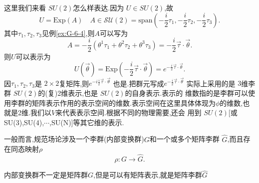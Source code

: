 \documentclass[../main.tex]{subfiles}
\begin{document}
 这里我们来看 $SU(2)$怎么样表达.因为 $U \in SU(2)$,故\[
 U = \text{Exp}(A) \quad A\in \mathscr{SU}(2) = \text{span}(-\frac{i}{2}\tau_1,-\frac{i}{2}\tau_2,-\frac{i}{2}\tau_3)
 .\] 
 其中$\tau_1,\tau_2,\tau_3$见例\ref{ex:G-6-4},则$A$可以写为 \[
 A = -\frac{i}{2}(\theta^1\tau_1 + \theta^2 \tau_2 +\theta^3 \tau_3) = -\frac{i}{2} \vec{\tau}\cdot \vec{\theta} 
 .\] 
 则$U$可以表示为 \[
 U(\vec{\theta}) = \text{Exp}(- \frac{i}{2} \vec{\tau}\cdot \vec{\theta}) = e^{- \frac{i}{2} \vec{\tau}\cdot \vec{\theta}}
 .\] 
 因$\tau_1,\tau_2,\tau_3$是 $2\times 2$复矩阵,则$e^{-i \frac{i}{2}\vec{\tau}\cdot \vec{\theta}}$ 也是.把群元写成$e^{-\frac{i}{2} \vec{\tau}\cdot \vec{\theta}}$ 实际上采用的是 $3$维李群 $SU(2)$的(复)2维表示,也是 $SU(2)$的自身表示.表示的
 维数指的是李群可以使用李群的矩阵表示作用的表示空间的维数.表示空间在这里具体体现为$\phi$的维数,也就是2维.我们以$V$来代表表示空间.根据不同的物理需要,还会
 用到 $SU(2)$[或SU(3),SU(4),$\cdots$,SU(N)]等其它维的表示.

 一般而言,规范场论涉及一个李群(内部变换群)$G$和一个或多个矩阵李群 $\hat{G}$,而且存在同态映射$\rho$\[
\rho : G \to \hat{G} 
 .\] 
 \begin{note}
   内部变换群不一定是矩阵群$G$,但是可以有矩阵表示,就是矩阵李群$\hat{G}$
 \end{note}
\end{document}
